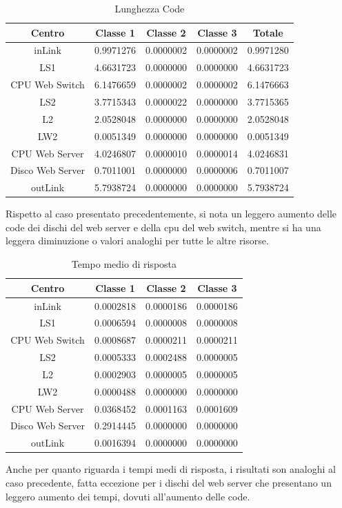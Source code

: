 \begin{table}[htbp]
\begin{center}
\begin{tabular}{|c|c|c|c|c|}
\hline
Centro	&Classe 1	&Classe 2	&Classe 3	&Totale\\
\hline
\hline
inLink & 0.9971276 & 0.0000002 & 0.0000002 & 0.9971280 \\ \hline
LS1 & 4.6631723 & 0.0000000 & 0.0000000 & 4.6631723 \\ \hline
CPU Web Switch & 6.1476659 & 0.0000002 & 0.0000002 & 6.1476663 \\ \hline
LS2 & 3.7715343 & 0.0000022 & 0.0000000 & 3.7715365 \\ \hline
L2 & 2.0528048 & 0.0000000 & 0.0000000 & 2.0528048 \\ \hline
LW2 & 0.0051349 & 0.0000000 & 0.0000000 & 0.0051349 \\ \hline
CPU Web Server & 4.0246807 & 0.0000010 & 0.0000014 & 4.0246831 \\ \hline
Disco Web Server & 0.7011001 & 0.0000000 & 0.0000006 & 0.7011007 \\ \hline
outLink & 5.7938724 & 0.0000000 & 0.0000000 & 5.7938724 \\ \hline
\end{tabular}
\end{center}
\caption{Lunghezza Code}
\label{lunghezzacode}
\end{table}
Rispetto al caso presentato precedentemente, si nota un leggero aumento delle code dei dischi del web server e della cpu del web switch, mentre si ha una leggera diminuzione o valori analoghi per tutte le altre risorse.
\begin{table}[htbp]
\begin{center}
\begin{tabular}{|c|c|c|c|}
\hline
Centro	&Classe 1	&Classe 2	&Classe 3\\
\hline
\hline
inLink & 0.0002818 & 0.0000186 & 0.0000186 \\ \hline
LS1 & 0.0006594 & 0.0000008 & 0.0000008 \\ \hline
CPU Web Switch & 0.0008687 & 0.0000211 & 0.0000211 \\ \hline
LS2 & 0.0005333 & 0.0002488 & 0.0000005 \\ \hline
L2 & 0.0002903 & 0.0000005 & 0.0000005 \\ \hline
LW2 & 0.0000488 & 0.0000000 & 0.0000000 \\ \hline
CPU Web Server & 0.0368452 & 0.0001163 & 0.0001609 \\ \hline
Disco Web Server & 0.2914445 & 0.0000000 & 0.0000000 \\ \hline
outLink & 0.0016394 & 0.0000000 & 0.0000000 \\ \hline
\end{tabular}
\end{center}
\caption{Tempo medio di risposta}
\label{tempomediorisposta}
\end{table}
Anche per quanto riguarda i tempi medi di risposta, i risultati son analoghi al caso precedente, fatta eccezione per i dischi del web server che presentano un leggero aumento dei tempi, dovuti all'aumento delle code.

